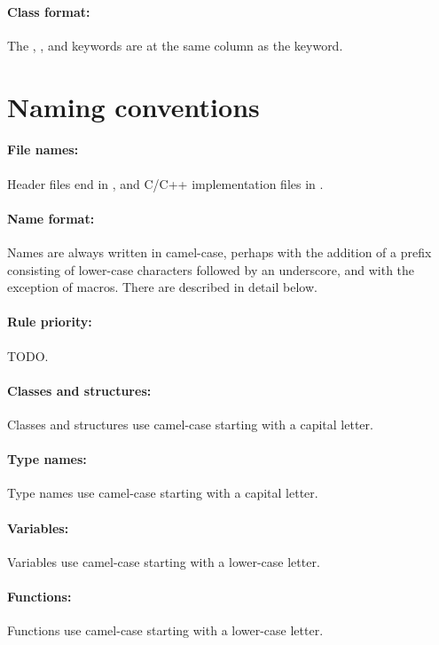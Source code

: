 \documentclass[footinclude=false,11pt,DIV11]{scrartcl}
\begin{document}
\paragraph{Class format:} The , , and 
keywords are at the same column as the  keyword.


\section{Naming conventions}

\paragraph{File names:} Header files end in , and C/C++ implementation files
in .

\paragraph{Name format:} Names are always written in camel-case, perhaps with the
addition of a prefix consisting of lower-case characters followed by an underscore,
and with the exception of macros. There are described in detail below.

\paragraph{Rule priority:} TODO.

\paragraph{Classes and structures:} Classes and structures use camel-case
starting with a capital letter.

\paragraph{Type names:} Type names use camel-case starting with a capital letter.

\paragraph{Variables:} Variables use camel-case starting with a lower-case letter.

\paragraph{Functions:} Functions use camel-case starting with a lower-case letter.
\end{document}
